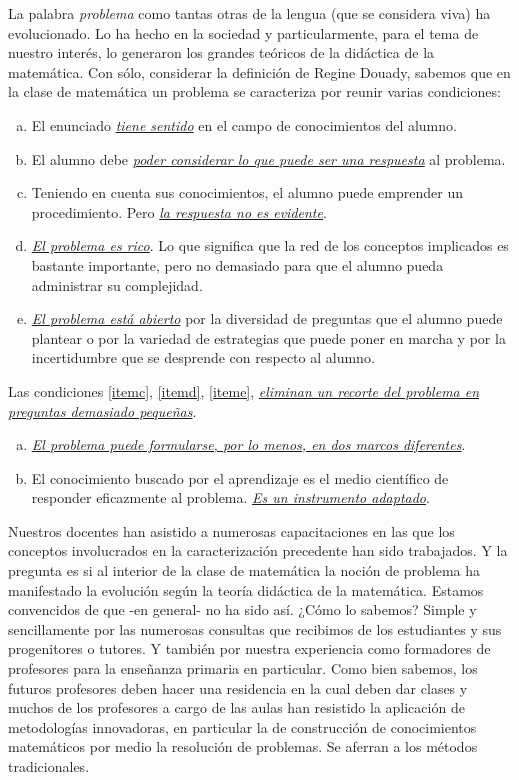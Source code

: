 \documentclass[oneside,spanish]{amsart}
\numberwithin{equation}{section}
\numberwithin{figure}{section}
\theoremstyle{definition}
\begin{document}
La palabra \textit{problema} como tantas otras de la lengua (que se considera viva) ha evolucionado. Lo ha hecho en la sociedad y particularmente, para el tema de nuestro interés, lo generaron los grandes teóricos de la didáctica de la matemática.  Con sólo, considerar la definición de Regine Douady, sabemos que en la clase de matemática un problema se caracteriza por reunir varias condiciones:
\begin{enumerate}[a)]
	\item El enunciado \underline{\textit{tiene sentido}} en el campo de conocimientos del alumno. 
	\item El alumno debe \underline{\textit{poder considerar lo que puede ser una respuesta}} al problema. 
	\item Teniendo en cuenta sus conocimientos, el alumno puede emprender un procedimiento. Pero \underline{\textit{la respuesta no es evidente}}.\label{itemc}
	\item \underline{\textit{El problema es rico}}. Lo que significa que la red de los conceptos implicados es bastante importante, pero no demasiado para que el alumno pueda administrar su complejidad.\label{itemd}
	\item \underline{\textit{El problema está abierto}} por la diversidad de preguntas que el alumno puede plantear o por la variedad de estrategias que puede poner en marcha y por la incertidumbre que se desprende con respecto al alumno.\label{iteme}
\end{enumerate}

Las condiciones \ref{itemc}, \ref{itemd}, \ref{iteme}, \underline{\textit{eliminan un recorte del problema en preguntas demasiado pequeñas}}.

\begin{enumerate}[a),resume]
	\item \underline{\textit{El problema puede formularse, por lo menos, en dos marcos diferentes}}.
	\item El conocimiento buscado por el aprendizaje es el medio científico de responder eficazmente al problema. \underline{\textit{Es un instrumento adaptado}}.
\end{enumerate}

Nuestros docentes han asistido a numerosas capacitaciones en las que los conceptos involucrados en la caracterización precedente han sido trabajados. Y la pregunta es si al interior de la clase de matemática la noción de problema ha manifestado la evolución según la teoría didáctica de la matemática. Estamos convencidos de que -en general- no ha sido así. ¿Cómo lo sabemos? Simple y sencillamente por las numerosas consultas que recibimos de los estudiantes y sus progenitores o tutores. Y también por nuestra experiencia como formadores de profesores para la enseñanza primaria en particular. Como bien sabemos, los futuros profesores deben hacer una residencia en la cual deben dar clases y muchos de los profesores a cargo de las aulas han resistido la aplicación de metodologías innovadoras, en particular la de construcción de conocimientos matemáticos por medio la resolución de problemas. Se aferran a los métodos tradicionales. 
\end{document}
